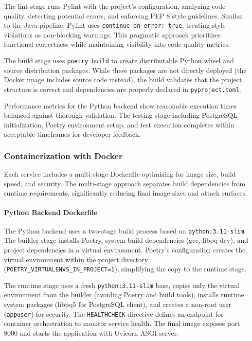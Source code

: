 \documentclass[12pt,a4paper]{article}
\begin{document}
The lint stage runs Pylint with the project's configuration, analyzing code quality, detecting potential errors, and enforcing PEP 8 style guidelines. Similar to the Java pipeline, Pylint uses \texttt{continue-on-error: true}, treating style violations as non-blocking warnings. This pragmatic approach prioritizes functional correctness while maintaining visibility into code quality metrics.\newline

The build stage uses \texttt{poetry build} to create distributable Python wheel and source distribution packages. While these packages are not directly deployed (the Docker image includes source code instead), the build validates that the project structure is correct and dependencies are properly declared in \texttt{pyproject.toml}.\newline

Performance metrics for the Python backend show reasonable execution times balanced against thorough validation. The testing stage including PostgreSQL initialization, Poetry environment setup, and test execution completes within acceptable timeframes for developer feedback.

\subsubsection{Containerization with Docker}

Each service includes a multi-stage Dockerfile optimizing for image size, build speed, and security. The multi-stage approach separates build dependencies from runtime requirements, significantly reducing final image sizes and attack surfaces.

\paragraph{Python Backend Dockerfile}

The Python backend uses a two-stage build process based on \texttt{python:3.11-slim}. The builder stage installs Poetry, system build dependencies (gcc, libpq-dev), and project dependencies in a virtual environment. Poetry's configuration creates the virtual environment within the project directory (\nolinkurl{POETRY_VIRTUALENVS_IN_PROJECT=1}), simplifying the copy to the runtime stage.\newline

The runtime stage uses a fresh \texttt{python:3.11-slim} base, copies only the virtual environment from the builder (avoiding Poetry and build tools), installs runtime system packages (libpq5 for PostgreSQL client), and creates a non-root user (\texttt{appuser}) for security. The \texttt{HEALTHCHECK} directive defines an endpoint for container orchestration to monitor service health. The final image exposes port 8000 and starts the application with Uvicorn ASGI server.
\end{document}
